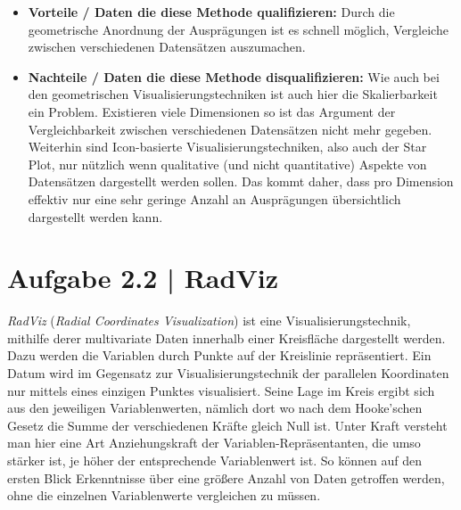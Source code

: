 \documentclass[a4paper,12pt,ngerman]{scrartcl}
\begin{document}
\begin{itemize}
	\item \textbf{Vorteile / Daten die diese Methode qualifizieren:}
	Durch die geometrische Anordnung der Ausprägungen ist es schnell möglich, Vergleiche zwischen verschiedenen Datensätzen auszumachen.

	\item \textbf{Nachteile / Daten die diese Methode disqualifizieren:}
	Wie auch bei den geometrischen Visualisierungstechniken ist auch hier die  Skalierbarkeit ein Problem. Existieren viele Dimensionen so ist das Argument der Vergleichbarkeit zwischen verschiedenen Datensätzen nicht mehr gegeben. Weiterhin sind Icon-basierte Visualisierungstechniken, also  auch der Star Plot, nur nützlich wenn qualitative (und nicht quantitative) Aspekte von Datensätzen dargestellt werden sollen. Das kommt daher, dass pro Dimension effektiv nur eine sehr geringe Anzahl an Ausprägungen übersichtlich dargestellt werden kann.

\end{itemize}

\section{Aufgabe 2.2 | RadViz}
\emph{RadViz} (\emph{Radial Coordinates Visualization}) ist eine Visualisierungstechnik, mithilfe derer multivariate Daten innerhalb einer Kreisfläche dargestellt werden. Dazu werden die Variablen durch Punkte auf der Kreislinie repräsentiert. Ein Datum wird im Gegensatz zur Visualisierungstechnik der parallelen Koordinaten nur mittels eines einzigen Punktes visualisiert. Seine Lage im Kreis ergibt sich aus den jeweiligen Variablenwerten, nämlich dort wo nach dem Hooke'schen Gesetz die Summe der verschiedenen Kräfte gleich Null ist. Unter Kraft versteht man hier eine Art Anziehungskraft der Variablen-Repräsentanten, die umso stärker ist, je höher der entsprechende Variablenwert ist. So können auf den ersten Blick Erkenntnisse über eine größere Anzahl von Daten getroffen werden, ohne die einzelnen Variablenwerte vergleichen zu müssen.
\end{document}
